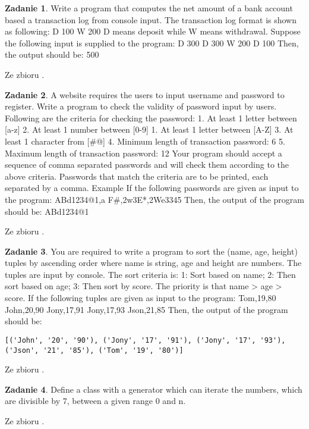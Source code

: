 \documentclass[11pt]{article}
\theoremstyle{definition}
\newtheorem{zadanie}{Zadanie}
\newcommand{\fromA}{\small Ze zbioru \cite{python100}.}
\begin{document}
\begin{zadanie}
Write a program that computes the net amount of a bank account based a transaction log from console input. The transaction log format is shown as following:
D 100
W 200
D means deposit while W means withdrawal.
Suppose the following input is supplied to the program:
D 300
D 300
W 200
D 100
Then, the output should be:
500

\fromA
\end{zadanie}
\begin{zadanie}
A website requires the users to input username and password to register. Write a program to check the validity of password input by users.
Following are the criteria for checking the password:
1. At least 1 letter between [a-z]
2. At least 1 number between [0-9]
1. At least 1 letter between [A-Z]
3. At least 1 character from [\#@]
4. Minimum length of transaction password: 6
5. Maximum length of transaction password: 12
Your program should accept a sequence of comma separated passwords and will check them according to the above criteria. Passwords that match the criteria are to be printed, each separated by a comma.
Example
If the following passwords are given as input to the program:
ABd1234@1,a F\#,2w3E*,2We3345
Then, the output of the program should be:
ABd1234@1

\fromA
\end{zadanie}
\begin{zadanie}
You are required to write a program to sort the (name, age, height) tuples by ascending order where name is string, age and height are numbers. The tuples are input by console. The sort criteria is:
1: Sort based on name;
2: Then sort based on age;
3: Then sort by score.
The priority is that name > age > score.
If the following tuples are given as input to the program:
Tom,19,80
John,20,90
Jony,17,91
Jony,17,93
Json,21,85
Then, the output of the program should be:
\begin{verbatim}
[('John', '20', '90'), ('Jony', '17', '91'), ('Jony', '17', '93'), ('Json', '21', '85'), ('Tom', '19', '80')]
\end{verbatim}

\fromA
\end{zadanie}
\begin{zadanie}
Define a class with a generator which can iterate the numbers, which are divisible by 7, between a given range 0 and n.

\fromA
\end{zadanie}
\end{document}
